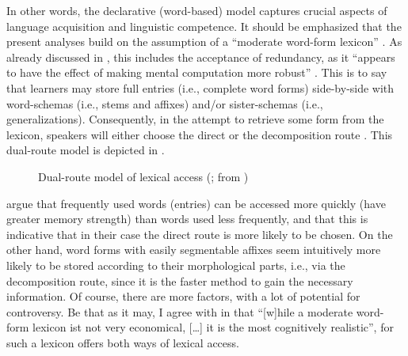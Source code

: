 \documentclass[output=paper,colorlinks,citecolor=brown]{langscibook}
\begin{document}
In other words, the declarative (word-based) model captures crucial aspects of language acquisition and linguistic competence. It should be emphasized that the present analyses build on the assumption of a ``moderate word-form lexicon'' \citep[see][70--74]{HaspelmathSims2010}. As already discussed in , this includes the acceptance of redundancy, as it ``appears to have the effect of making mental computation more robust'' \citep[6]{Libben2007}. This is to say that learners may store full entries (i.e., complete word forms) side-by-side with word-schemas (i.e., stems and affixes) and/or sister-schemas (i.e., generalizations). Consequently, in the attempt to retrieve some form from the lexicon, speakers will either choose the direct or the decomposition route \citep[see][72]{HaspelmathSims2010}. This dual-route model is depicted in .

\begin{figure}
\centering
{}
\caption{Dual-route model of lexical access (\citealt[1045]{Hay2001}; from \citealt[72]{HaspelmathSims2010})}
\label{fig:LexicalAccess}
\end{figure} 

\citet[73]{HaspelmathSims2010} argue that frequently used words (entries) can be accessed more quickly (have greater memory strength) than words used less frequently, and that this is indicative that in their case the direct route is more likely to be chosen. On the other hand, word forms with easily segmentable affixes seem intuitively more likely to be stored according to their morphological parts, i.e., via the decomposition route, since it is the faster method to gain the necessary information. Of course, there are more factors, with a lot of potential for controversy. Be that as it may, I agree with \citet[74]{HaspelmathSims2010} in that ``[w]hile a moderate word-form lexicon ist not very economical, [\dots] it is the most cognitively realistic'', for such a lexicon offers both ways of lexical access.
\end{document}

